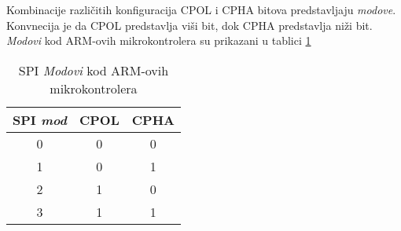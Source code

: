 Kombinacije različitih konfiguracija CPOL i CPHA bitova predstavljaju \textit{modove}. Konvnecija je da CPOL predstavlja viši bit, dok CPHA predstavlja niži bit. \textit{Modovi} kod ARM-ovih mikrokontrolera su prikazani u tablici \ref{Tab:spi_modes}
\begin{center}
	\begin{table}[H]
		\centering
		\begin{tabular}{| c | c | c |}
			\hline
			SPI \textit{mod} & CPOL & CPHA \\
			\hline
			0 & 0 & 0 \\
			\hline
			1 & 0 & 1 \\
			\hline
			2 & 1 & 0 \\
			\hline
			3 & 1 & 1 \\
			\hline
		\end{tabular}
		\caption{SPI \textit{Modovi} kod ARM-ovih mikrokontrolera \cite{spi_wikipedia}}
		\label{Tab:spi_modes}
	\end{table}
\end{center}